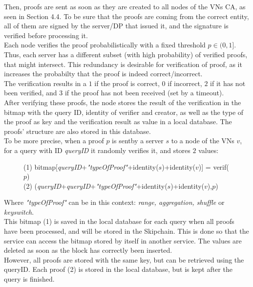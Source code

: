\documentclass{article}
\begin{document}
Then, proofs are sent as soon as they are created to all nodes of the VNs CA, as seen in Section 4.4. To be sure that the proofs are coming from the correct entity, all of them are signed by the server/DP that issued it, and the signature is verified before processing it.\\
Each node verifies the proof probabilistically with a fixed threshold $p \in (0,1]$. Thus, each server has a different subset (with high probability) of verified proofs, that might intersect. This redundancy is desirable for verification of proof, as it increases the probabilty that the proof is indeed correct/incorrect.\\
The verification results in a $1$ if the proof is correct, $0$ if incorrect, $2$ if it has not been verified, and 3 if the proof has not been received (set by a timeout).\\
After verifying these proofs, the node stores the result of the verification in the bitmap with the query ID, identity of verifier and creator, as well as the type of the proof as key and the verification result as value in a local database. The proofs' structure are also stored in this database.\\

To be more precise, when a proof $p$ is sentby a server $s$ to a node of the VNs $v$, for a query with ID \textit{queryID} it randomly verifies it, and stores $2$ values:\\
\begin{figure}[H]
\center
(1) bitmap[\textit{queryID}+\textit{"typeOfProof"}+identity($s$)+identity($v$)] = verif($p$)\\
(2) (\textit{queryID}+\textit{queryID}+\textit{"typeOfProof"}+identity($s$)+identity($v$),$p$)
\end{figure}
Where \textit{"typeOfProof"} can be in this context: \textit{range, aggregation, shuffle} or \textit{keyswitch}.\\
This bitmap (1) is saved in the local database for each query when all proofs have been processed, and will be stored in the Skipchain. This is done so that the service can access the bitmap stored by itself in another service. The values are deleted as  soon as the block has correctly been inserted.\\
However, all proofs are stored with the same key, but can be retrieved using the queryID. Each proof (2) is stored in the local database, but is kept after the query is finished.\\
\end{document}
